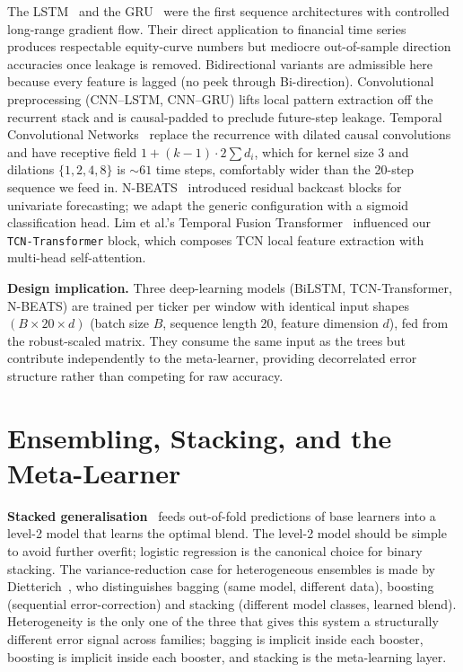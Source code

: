 The LSTM~\cite{hochreiter1997lstm} and the GRU~\cite{cho2014gru} were the first sequence architectures with controlled long-range gradient flow. Their direct application to financial time series~\cite{fischer2018lstm,sezer2020survey} produces respectable equity-curve numbers but mediocre out-of-sample direction accuracies once leakage is removed. Bidirectional variants are admissible here because every feature is lagged (no peek through Bi-direction). Convolutional preprocessing (CNN--LSTM, CNN--GRU) lifts local pattern extraction off the recurrent stack and is causal-padded to preclude future-step leakage. Temporal Convolutional Networks~\cite{bai2018tcn} replace the recurrence with dilated causal convolutions and have receptive field $1 + (k-1) \cdot 2 \sum d_i$, which for kernel size 3 and dilations $\{1, 2, 4, 8\}$ is $\sim 61$ time steps, comfortably wider than the 20-step sequence we feed in. N-BEATS~\cite{oreshkin2020nbeats} introduced residual backcast blocks for univariate forecasting; we adapt the generic configuration with a sigmoid classification head. Lim et al.'s Temporal Fusion Transformer~\cite{lim2021tft} influenced our \texttt{TCN-Transformer} block, which composes TCN local feature extraction with multi-head self-attention.

\textbf{Design implication.} Three deep-learning models (BiLSTM, TCN-Transformer, N-BEATS) are trained per ticker per window with identical input shapes $(B \times 20 \times d)$ (batch size $B$, sequence length 20, feature dimension $d$), fed from the robust-scaled matrix. They consume the same input as the trees but contribute independently to the meta-learner, providing decorrelated error structure rather than competing for raw accuracy.

\section{Ensembling, Stacking, and the Meta-Learner}

\textbf{Stacked generalisation}~\cite{wolpert1992stacking} feeds out-of-fold predictions of base learners into a level-2 model that learns the optimal blend. The level-2 model should be simple to avoid further overfit; logistic regression is the canonical choice for binary stacking. The variance-reduction case for heterogeneous ensembles is made by Dietterich~\cite{dietterich2000ensemble}, who distinguishes bagging (same model, different data), boosting (sequential error-correction) and stacking (different model classes, learned blend). Heterogeneity is the only one of the three that gives this system a structurally different error signal across families; bagging is implicit inside each booster, boosting is implicit inside each booster, and stacking is the meta-learning layer.

